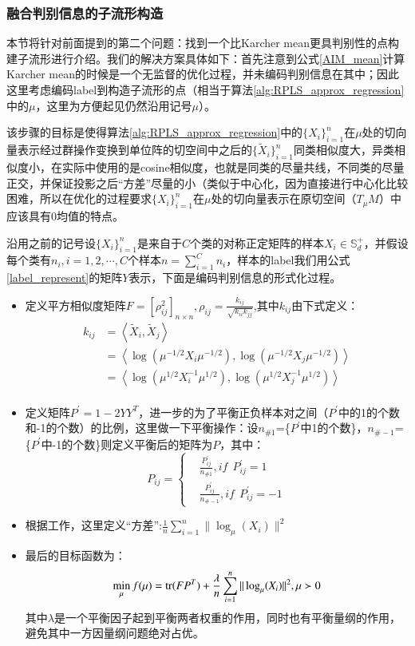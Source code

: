 \subsubsection{融合判别信息的子流形构造}
\label{sec:discrim_single_support}
本节将针对前面提到的第二个问题：找到一个比Karcher mean更具判别性的点构建子流形进行介绍。我们的解决方案具体如下：首先注意到公式\ref{AIM_mean}计算Karcher mean的时候是一个无监督的优化过程，并未编码判别信息在其中；因此这里考虑编码label到构造子流形的点（相当于算法\ref{alg:RPLS_approx_regression}中的$\mu$，这里为方便起见仍然沿用记号$\mu$）。

该步骤的目标是使得算法\ref{alg:RPLS_approx_regression}中的$\{X_i\}_{i=1}^{n}$在$\mu$处的切向量表示经过群操作变换到单位阵的切空间中之后的$\{\tilde{X}_i\}_{i=1}^{n}$同类相似度大，异类相似度小，在实际中使用的是cosine相似度，也就是同类的尽量共线，不同类的尽量正交，并保证投影之后“方差”尽量的小（类似于中心化，因为直接进行中心化比较困难，所以在优化的过程要求$\{X_i\}_{i=1}^{n}$在$\mu$处的切向量表示在原切空间（$T_{\mu}M$）中应该具有0均值的特点。

沿用之前的记号设$\{X_i\}_{i=1}^{n}$是来自于$C$个类的对称正定矩阵的样本$X_i \in \mathbb{S}_{d}^{+}$，并假设每个类有$n_i,i=1,2,\cdots,C$个样本$n=\sum_{i=1}^{C}n_i$，样本的label我们用公式\ref{label_represent}的矩阵$Y$表示，下面是编码判别信息的形式化过程。
\begin{itemize}
\item 定义平方相似度矩阵$F=[\rho_{ij}^{2}]_{n\times n},\rho_{ij}=\frac{k_{ij}}{\sqrt{k_{ii}k_{jj}}}$,其中$k_{ij}$由下式定义：
\begin{equation}
\begin{split}
k_{ij}&=\left<\tilde{X}_i,\tilde{X}_j\right>\\
&=\left<\log(\mu^{-1/2}X_i\mu^{-1/2}),\log(\mu^{-1/2}X_j\mu^{-1/2})\right>\\
&=\left<\log(\mu^{1/2}X_{i}^{-1}\mu^{1/2}),\log(\mu^{1/2}X_{j}^{-1}\mu^{1/2})\right>\\
\end{split}
\end{equation}
\item 定义矩阵$P^{\prime}=1-2YY^{T}$，进一步的为了平衡正负样本对之间（$P^{\prime}$中的1的个数和-1的个数）的比例，这里做一下平衡操作：设$n_{\#1}$=\{$P^{\prime}$中1的个数\}，$n_{\#-1}$=\{$P^{\prime}$中-1的个数\}则定义平衡后的矩阵为$P$，其中：
\begin{equation}
P_{ij}=\left\{
\begin{split}
&\frac{P_{ij}^{\prime}}{n_{\#1}},if~~P_{ij}^{\prime}=1\\
&\frac{P_{ij}^{\prime}}{n_{\#-1}},if~~P_{ij}^{\prime}=-1
\end{split}
\right.
\end{equation}
\item 根据工作\cite{PGA}，这里定义“方差”:$\frac{1}{n}\sum_{i=1}^{n} \|\log_{\mu}(X_i)\|^2$
\item 最后的目标函数为：
\begin{equation}
\label{support_search}
\min_{\mu}f(\mu)={\rm tr}(FP^{T})+\frac{\lambda}{n}\sum_{i=1}^{n} \|\log_{\mu}(X_i)\|^2,\mu \succ 0
\end{equation}
其中$\lambda$是一个平衡因子起到平衡两者权重的作用，同时也有平衡量纲的作用，避免其中一方因量纲问题绝对占优。
\end{itemize}
